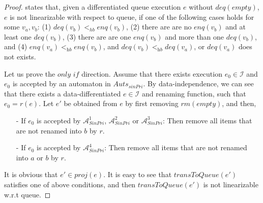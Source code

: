 %


\begin {proof}

\cite{Bouajjani:2015} states that, given a differentiated queue execution $e$ without $\textit{deq}(\textit{empty})$, $e$ is not linearizable with respect to queue, if one of the following cases holds for some $v_a,v_b$: (1) $\textit{deq}(v_b) <_{hb} \textit{enq}(v_b)$, (2) there are are no $\textit{enq}(v_b)$ and at least one $\textit{deq}(v_b)$, (3) there are are one $\textit{enq}(v_b)$ and more than one $\textit{deq}(v_b)$, and (4) $\textit{enq}(v_a) <_{\textit{hb}} \textit{enq}(v_b)$, and $\textit{deq}(v_b) <_{\textit{hb}} \textit{deq}(v_a)$, or $\textit{deq}(v_a)$ does not exists.

Let us prove the $\textit{only if}$ direction. Assume that there exists execution $e_0 \in \mathcal{I}$ and $e_0$ is accepted by an automaton in $\textit{Auts}_{\textit{sinPri}}$. By data-independence, we can see that there exists a data-differentiated $e \in \mathcal{I}$ and renaming function, such that $e_0=r(e)$. Let $e'$ be obtained from $e$ by first removing $\textit{rm}(\textit{empty})$, and then,

\begin{itemize}
\setlength{\itemsep}{0.5pt}
\item[-] If $e_0$ is accepted by $\mathcal{A}_{\textit{SinPri}}^1$, $\mathcal{A}_{\textit{SinPri}}^2$ or $\mathcal{A}_{\textit{SinPri}}^3$: Then remove all items that are not renamed into $b$ by $r$.

\item[-] If $e_0$ is accepted by $\mathcal{A}_{\textit{SinPri}}^4$: Then remove all items that are not renamed into $a$ or $b$ by $r$.
\end{itemize}

It is obvious that $e' \in \textit{proj}(e)$. It is easy to see that $\textit{transToQueue}(e')$ satisfies one of above conditions, and then $\textit{transToQueue}(e')$ is not linearizable w.r.t queue.


\end{proof}

